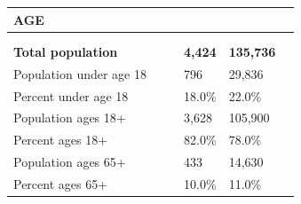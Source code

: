 \documentclass[9pt]{report}
\begin{document}
\vspace{24pt}
\setlength{\tabcolsep}{.01in} %
\begin{tabular}{p{.10in}p{.10in}p{.10in}p{3.7in}>{\hfill}p{.85in}>{\hfill}p{.85in}>{\hfill}p{.85in}>{\hfill}p{.85in}p{0.1in}}
\multicolumn{9}{l}{\parbox{7.1in}{\raggedright{\large{\strut\textbf{AGE}\strut}}}} \\ 
\hline
\multicolumn{4}{l}{\parbox{3.5in}{\raggedright{\textbf{}}}} & \multicolumn{1}{r}{\parbox{.85in}{\strut\raggedleft{\textbf{}\strut}}} & \multicolumn{1}{r}{\parbox{.85in}{\strut\raggedleft{\textbf{}\strut}}} & \multicolumn{1}{r}{\parbox{.85in}{\strut{}}} & \multicolumn{1}{r}{\parbox{.85in}{\strut{}}} & \\ 
\multicolumn{9}{l}{} \\ 
\multicolumn{4}{l}{\parbox{3.5in}{\strut\raggedright{\textbf{Total population}\strut}}} & \textbf{} & \textbf{} & \textbf{4,424} & \textbf{135,736} & \textbf{} \\ 
\multicolumn{4}{l}{\parbox{3.6in}{\strut\raggedright{{Population under age 18}}\strut}} &  &  & 796 & 29,836 & \multicolumn{1}{l}{}  \\ 
\multicolumn{4}{l}{\parbox{3.6in}{\strut\raggedright{{Percent under age 18}}\strut}} &  &  & 18.0\% & 22.0\% & \multicolumn{1}{l}{}  \\ 
\multicolumn{4}{l}{\parbox{3.6in}{\strut\raggedright{{Population ages 18+}}\strut}} &  &  & 3,628 & 105,900 & \multicolumn{1}{l}{}  \\ 
\multicolumn{4}{l}{\parbox{3.6in}{\strut\raggedright{{Percent ages 18+}}\strut}} &  &  & 82.0\% & 78.0\% & \multicolumn{1}{l}{}  \\ 
\multicolumn{4}{l}{\parbox{3.6in}{\strut\raggedright{{Population ages 65+}}\strut}} &  &  & 433 & 14,630 & \multicolumn{1}{l}{}  \\ 
\multicolumn{4}{l}{\parbox{3.6in}{\strut\raggedright{{Percent ages 65+}}\strut}} &  &  & 10.0\% & 11.0\% & \multicolumn{1}{l}{}  \\ 

\end{tabular}
\setlength{\tabcolsep}{6pt} %
\end{document}
